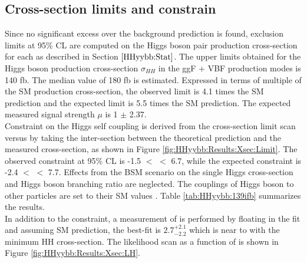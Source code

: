 \subsection{Cross-section limits and \kl constrain}
\label{HHyybb:Results:Xsec}
 Since no significant excess over the background prediction is found, exclusion limits at 95\% CL are computed on the Higgs boson pair production cross-section for each \kl as described in Section $\ref{HHyybb:Stat}$. The upper limits obtained for the Higgs boson production cross-section $\sigma_{HH}$ in the ggF + VBF production modes is 140 fb. The median value of 180 fb is estimated. Expressed in terms of multiple of the SM production cross-section, the observed limit is 4.1 times the SM prediction and the expected limit is 5.5 times the SM prediction. The expected measured signal strength $\mu$ is 1 $\pm$ 2.37.\\

Constraint on the Higgs self coupling is derived from the cross-section limit scan versus \kl by taking the inter-section between the theoretical prediction and the measured cross-section, as shown in Figure \ref{fig:HHyybb:Results:Xsec:Limit}. The observed constraint at 95\% CL is -1.5 $<$ \kl $<$ 6.7, while the expected constraint is -2.4 $<$ \kl $<$ 7.7. Effects from the BSM scenario on the single Higgs cross-section and Higgs boson branching ratio are neglected. The couplings of Higgs boson to other particles are set to their SM values \cite{Higgs_80ifb}. Table \ref{tab:HHyybb:139ifb} summarizes the results. \\
In addition to the constraint, a measurement of \kl is performed by floating \kl in the fit and assuming SM prediction, the best-fit \kl is $2.7^{+2.1}_{-2.2}$ which is near to \kl with the minimum HH cross-section. The likelihood scan as a function of \kl is shown in Figure \ref{fig:HHyybb:Results:Xsec:LH}.

